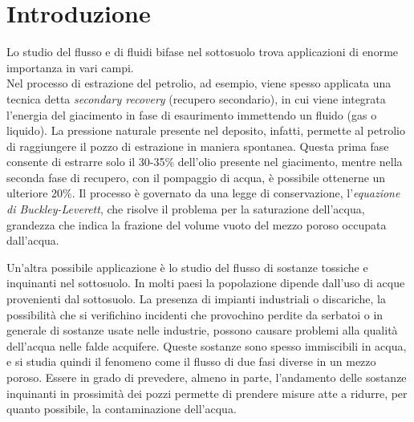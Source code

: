 \chapter*{Introduzione} \label{cap:Introduzione}
\rhead[]{\fancyplain{}{\footnotesize{\leftmark}}}
\lfoot[\fancyplain{}{\bf \thepage}]{}
\cfoot{} %
\rfoot[]{\fancyplain{}{\bf \thepage}}

Lo studio del flusso e di fluidi bifase nel sottosuolo trova applicazioni di enorme importanza in vari campi.\\
Nel processo di estrazione del petrolio, ad esempio, viene spesso applicata una tecnica detta \textit{secondary recovery} (recupero secondario), in cui viene integrata l'energia del giacimento in fase di esaurimento immettendo un fluido (gas o liquido). La pressione naturale presente nel deposito, infatti, permette al petrolio di raggiungere il pozzo di estrazione in maniera spontanea. Questa prima fase consente di estrarre solo il 30-35\% dell'olio presente nel giacimento, mentre nella seconda fase di recupero, con il pompaggio di acqua, è possibile ottenerne un ulteriore 20\%.
Il processo è governato da una legge di conservazione, l'\textit{equazione di Buckley-Leverett}, che risolve il problema per la saturazione dell'acqua, grandezza che indica la frazione del volume vuoto del mezzo poroso occupata dall'acqua. \\
\par \noindent Un'altra possibile applicazione è lo studio del flusso di sostanze tossiche e inquinanti nel sottosuolo. In molti paesi la popolazione dipende dall'uso di acque provenienti dal sottosuolo. La presenza di impianti industriali o discariche, la possibilità che si verifichino incidenti che provochino perdite da serbatoi o in generale di sostanze usate nelle industrie, possono causare problemi alla qualità dell'acqua nelle falde acquifere. Queste sostanze sono spesso immiscibili in acqua, e si studia quindi il fenomeno come il flusso di due fasi diverse in un mezzo poroso. Essere in grado di prevedere, almeno in parte, l'andamento delle sostanze inquinanti in prossimità dei pozzi permette di prendere misure atte a ridurre, per quanto possibile, la contaminazione dell'acqua.\\

